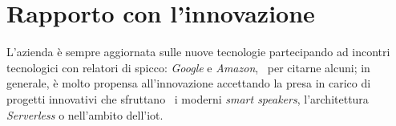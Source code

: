 \section{Rapporto con l'innovazione}
L'azienda è sempre aggiornata sulle nuove tecnologie partecipando ad incontri tecnologici con relatori di spicco: \emph{Google} e \emph{Amazon}, \
per citarne alcuni; in generale, è molto propensa all'innovazione accettando la presa in carico di progetti innovativi che sfruttano \
i moderni \emph{smart speakers}, l'architettura \emph{Serverless} o nell'ambito dell'\acrfull{iot}.
